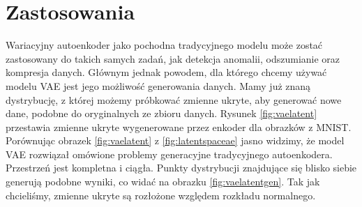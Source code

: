 \documentclass[a4paper,12pt,oneside]{book} %
\begin{document}
\section{Zastosowania}
Wariacyjny autoenkoder jako pochodna tradycyjnego modelu może zostać zastosowany do takich samych zadań, jak detekcja anomalii, odszumianie oraz kompresja danych. Głównym jednak powodem, dla którego chcemy używać modelu VAE jest jego możliwość generowania danych. Mamy już znaną dystrybucję, z której możemy próbkować zmienne ukryte, aby generować nowe dane, podobne do oryginalnych ze zbioru danych. Rysunek \ref{fig:vaelatent} przestawia zmienne ukryte wygenerowane przez enkoder dla obrazków z MNIST. Porównując obrazek \ref{fig:vaelatent} z \ref{fig:latentspaceae} jasno widzimy, że model VAE rozwiązał omówione problemy generacyjne tradycyjnego autoenkodera. Przestrzeń jest kompletna i ciągła. Punkty dystrybucji znajdujące się blisko siebie generują podobne wyniki, co widać na obrazku \ref{fig:vaelatentgen}. Tak jak chcieliśmy, zmienne ukryte są rozłożone względem rozkładu normalnego. 
\end{document}
